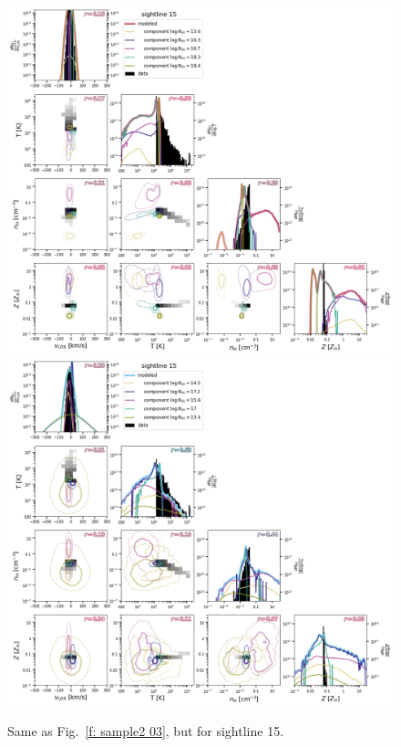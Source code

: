 \documentclass[fleqn,usenatbib]{mnras}
\begin{document}
\begin{figure}
    \centering
    \includegraphics[height=0.45\textheight]{figures/sample2/original/sightline_0015.png}
    \includegraphics[height=0.45\textheight]{figures/sample2/high-z/sightline_0015.png}
    \label{f: sample2 15}
    \caption{Same as Fig.~\ref{f: sample2 03}, but for sightline 15.}
\end{figure}
\end{document}
